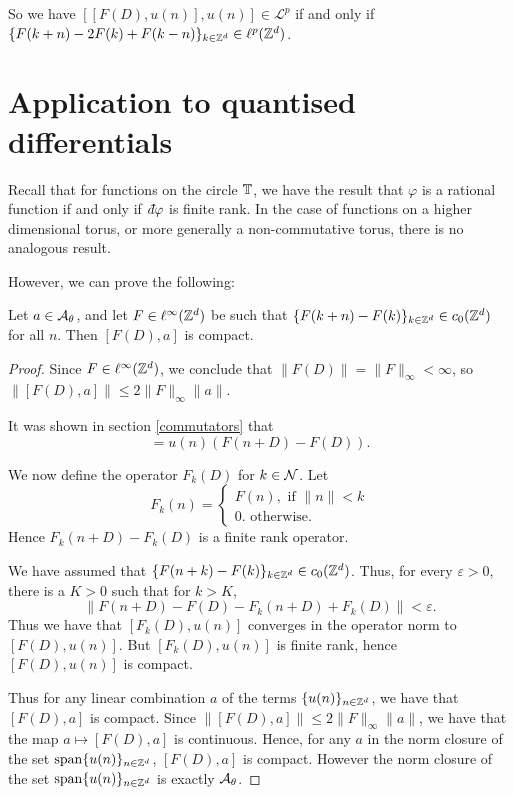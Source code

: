 So we have $[[F(D),u(n)],u(n)] \in \mathcal{L}^p$
if and only if $\{F(k+n)-2F(k)+F(k-n)\}_{k\in \mathbb{Z}^d} \in \ell^p(\mathbb{Z}^d)$.

\section{Application to quantised differentials}
Recall that for functions on the circle $\mathbb{T}$, we have the result
that $\varphi$ is a rational function if and only if $\qd \varphi$
is finite rank. In the case of functions on a higher dimensional
torus, or more generally a non-commutative torus, there is no analogous
result.

However, we can prove the following:
\begin{proposition}
\label{compactNCCommutators}
    Let $a \in \mathcal{A}_\theta$, and let $F \in \ell^\infty(\mathbb{Z}^d)$ be such
    that $\{F(k+n)-F(k)\}_{k \in \mathbb{Z}^d} \in c_0(\mathbb{Z}^d)$
    for all $n$. Then $[F(D),a]$ is compact.
\end{proposition}
\begin{proof}
    Since $F \in \ell^\infty(\mathbb{Z}^d)$, we conclude that $\|F(D)\| = \|F\|_\infty < \infty$,
    so $\|[F(D),a]\| \leq 2\|F\|_\infty \|a\|$. 
    
    It was shown in section \ref{commutators} that 
    \begin{equation}
        [F(D),u(n)] = u(n)(F(n+D)-F(D)).
    \end{equation} 
    
    We now define the operator $F_k(D)$ for $k \in \mathcal{N}$. Let
    \begin{equation}
        F_k(n) = \begin{cases}
            F(n),\text{ if }\|n\| < k\\
            0.\text{ otherwise.}
        \end{cases} 
    \end{equation}
    Hence $F_k(n+D)-F_k(D)$ is a finite rank operator. 
    
    We have assumed that $\{F(n+k)-F(k)\}_{k \in \mathbb{Z}^d} \in c_0(\mathbb{Z}^d)$. Thus,
    for every $\varepsilon > 0$, there is a $K > 0$ such that for $k > K$,
    \begin{equation}
        \|F(n+D)-F(D) - F_k(n+D)+F_k(D)\| < \varepsilon.
    \end{equation}
    Thus we have that $[F_k(D),u(n)]$ converges in the operator
    norm to $[F(D),u(n)]$. But $[F_k(D),u(n)]$ is finite rank,
    hence $[F(D),u(n)]$ is compact.
    
    Thus for any linear combination $a$ of the terms $\{u(n)\}_{n \in \mathbb{Z}^d}$,
    we have that $[F(D),a]$ is compact. Since $\|[F(D),a]\| \leq 2\|F\|_\infty\|a\|$,
    we have that the map $a\mapsto [F(D),a]$ is continuous. Hence,
    for any $a$  in the norm closure of the set $\operatorname{span}\{u(n)\}_{n \in \mathbb{Z}^d}$, 
    $[F(D),a]$ is compact. However the norm closure of the set $\operatorname{span}\{u(n)\}_{n \in \mathbb{Z}^d}$
    is exactly $\mathcal{A}_\theta$.
\end{proof} 

